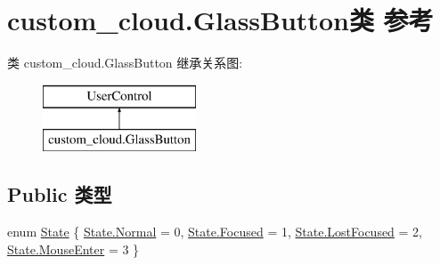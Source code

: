 \hypertarget{classcustom__cloud_1_1_glass_button}{}\section{custom\+\_\+cloud.\+Glass\+Button类 参考}
\label{classcustom__cloud_1_1_glass_button}
类 custom\+\_\+cloud.\+Glass\+Button 继承关系图\+:\begin{figure}[H]
\begin{center}
\leavevmode
\includegraphics[height=2.000000cm]{classcustom__cloud_1_1_glass_button}
\end{center}
\end{figure}
\subsection*{Public 类型}
\begin{DoxyCompactItemize}
\item 
enum \hyperlink{classcustom__cloud_1_1_glass_button_a78024a1cd7684c7768f3a68034adc7e5}{State} \{ \hyperlink{classcustom__cloud_1_1_glass_button_a78024a1cd7684c7768f3a68034adc7e5a960b44c579bc2f6818d2daaf9e4c16f0}{State.\+Normal} = 0, 
\hyperlink{classcustom__cloud_1_1_glass_button_a78024a1cd7684c7768f3a68034adc7e5aa2e08e1fbbc3e1489d688eba112f7964}{State.\+Focused} = 1, 
\hyperlink{classcustom__cloud_1_1_glass_button_a78024a1cd7684c7768f3a68034adc7e5ab34e8a9ccebcc7f8b541be321564cbf5}{State.\+Lost\+Focused} = 2, 
\hyperlink{classcustom__cloud_1_1_glass_button_a78024a1cd7684c7768f3a68034adc7e5a68c02431dd2d34247118300cf24c77ea}{State.\+Mouse\+Enter} = 3
 \}
\end{DoxyCompactItemize}
